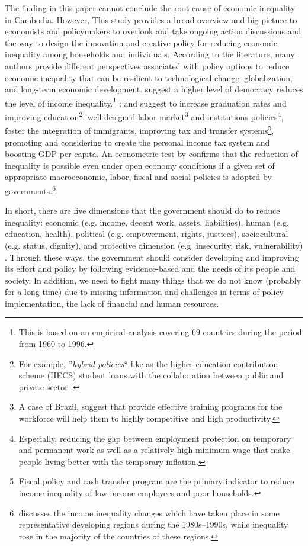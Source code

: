 \documentclass[11pt,letterpaper]{article}
\begin{document}
The finding in this paper cannot conclude the root cause of economic inequality in Cambodia. However, This study provides a broad overview and big picture to economists and policymakers to overlook and take ongoing action discussions and the way to design the innovation and creative policy for reducing economic inequality among households and individuals. According to the literature, many authors provide different perspectives associated with policy options to reduce economic inequality that can be resilient to technological change, globalization, and long-term economic development. \citet{Reuveny2003} suggest a higher level of democracy reduces the level of income inequality.\footnote{This is based on an empirical analysis covering 69 countries during the period from 1960 to 1996.} \citet{Bastagli2012, Breunig2019, Cingano2014, OECD2012}; and \citet{Penalosa2007} suggest to increase graduation rates and improving education\footnote{For example, ''\textit{hybrid policies}`` like as the higher education contribution scheme (HECS) student loans with the collaboration between public and private sector \cite{Breunig2019}.}, well-designed labor market\footnote{A case of Brazil, \citet{Herran2005} suggest that provide effective training programs for the workforce will help them to highly competitive and high productivity.} and institutions policies\footnote{Especially, reducing the gap between employment protection on temporary and permanent work as well as a relatively high minimum wage that make people living better with the temporary inflation.}, foster the integration of immigrants, improving tax and transfer systems\footnote{Fiscal policy and cash transfer program are the primary indicator to reduce income inequality of low-income employees and poor households.}, promoting and considering to create the personal income tax system and boosting GDP per capita. An econometric test by \citet{Cornia2012} confirms that the reduction of inequality is possible even under open economy conditions if a given set of appropriate macroeconomic, labor, fiscal and social policies is adopted by governments.\footnote{\citet{Cornia2012} discusses the income inequality changes which have taken place in some representative developing regions during the 1980s--1990s, while inequality rose in the majority of the countries of these regions.}


In short, there are five dimensions that the government should do to reduce inequality: economic (e.g. income, decent work, assets, liabilities), human (e.g. education, health), political (e.g. empowerment, rights, justices), sociocultural (e.g. status, dignity), and protective dimension (e.g. insecurity, risk, vulnerability) \cite{Cornia2012, GIZ2015}. Through these ways, the government should consider developing and improving its effort and policy by following evidence-based and the needs of its people and society. In addition, we need to fight many things that we do not know (probably for a long time) due to missing information and challenges in terms of policy implementation, the lack of financial and human resources. 
\end{document}
